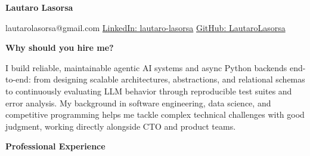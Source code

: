 \documentclass[10pt]{article}
\begin{document}
\small
\begin{center}
    \huge
    \textbf{Lautaro Lasorsa}\\ 
    \hrulefill
\end{center}
\vspace{-4pt}
\begin{center}
    lautarolasorsa@gmail.com \textbullet \href{https://www.linkedin.com/in/lautaro-lasorsa/}{LinkedIn: lautaro-lasorsa} \textbullet \href{https://github.com/LautaroLasorsa}{GitHub: LautaroLasorsa}
\end{center}
\vspace{-4pt}
\begin{center}
    \textbf{Why should you hire me?}
\end{center}
\vspace{-2pt}
I build reliable, maintainable agentic AI systems and async Python backends end-to-end: from designing scalable architectures, abstractions, and relational schemas to continuously evaluating LLM behavior through reproducible test suites and error analysis. My background in software engineering, data science, and competitive programming helps me tackle complex technical challenges with good judgment, working directly alongside CTO and product teams.

\vspace{-2pt}
\begin{center}
    \textbf{Professional Experience}
\end{center}
\vspace{-2pt}
\end{document}
